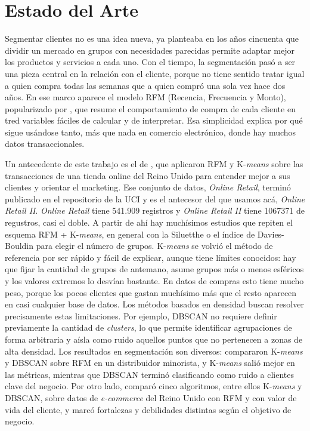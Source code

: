 \documentclass[a4paper,10pts,openany]{book}
\begin{document}
	\section{Estado del Arte}
	Segmentar clientes no es una idea nueva, \citet{smith1956} ya planteaba en los años cincuenta que dividir un mercado en grupos con necesidades parecidas permite adaptar mejor los productos y servicios a cada uno. Con el tiempo, la segmentación pasó a ser una pieza central en la relación con el cliente, porque no tiene sentido tratar igual a quien compra todas las semanas que a quien compró una sola vez hace dos años. En ese marco aparece el modelo RFM (Recencia, Frecuencia y Monto), popularizado por \citet{hughes1994}, que resume el comportamiento de compra de cada cliente en tred variables fáciles de calcular y de interpretar. Esa simplicidad explica por qué sigue usándose tanto, más que nada en comercio electrónico, donde hay muchos datos transaccionales.
	
	Un antecedente de este trabajo es el de \citet{chen2012}, que aplicaron RFM y K-\emph{means} sobre las transacciones de una tienda online del Reino Unido para entender mejor a sus clientes y orientar el marketing. Ese conjunto de datos, \emph{Online Retail}, terminó publicado en el repositorio de la UCI y es el antecesor del que usamos acá, \emph{Online Retail II}. \emph{Online Retail} tiene 541.909 registros y \emph{Online Retail II} tiene 1067371 de regustros, casi el doble. A partir de ahí hay muchísimos estudios que repiten el esquema RFM + K-\emph{means}, en general con la Siluetthe o el índice de Davies-Bouldin para elegir el número de grupos. K-\emph{means} \citep{macqueen1967} se volvió el método de referencia por ser rápido y fácil de explicar, aunque tiene límites conocidos: hay que fijar la cantidad de grupos de antemano, asume grupos más o menos esféricos y los valores extremos lo desvían bastante. En datos de compras esto tiene mucho peso, porque los pocos clientes que gastan muchísimo más que el resto aparecen en casi cualquier base de datos. Los métodos basados en densidad buscan resolver precisamente estas limitaciones. Por ejemplo, DBSCAN \citep{ester1996} no requiere definir previamente la cantidad de \emph{clusters}, lo que permite identificar agrupaciones de forma arbitraria y aísla como ruido aquellos puntos que no pertenecen a zonas de alta densidad. Los resultados en segmentación son diversos: \citet{lau2026} compararon K-\emph{means} y DBSCAN sobre RFM en un distribuidor minorista, y K-\emph{means} salió mejor en las métricas, mientras que DBSCAN terminó clasificando como ruido a clientes clave del negocio. Por otro lado, \citet{aimar2025} comparó cinco algoritmos, entre ellos K-\emph{means} y DBSCAN, sobre datos de \emph{e-commerce} del Reino Unido con RFM y con valor de vida del cliente, y marcó fortalezas y debilidades distintas según el objetivo de negocio.
	
\end{document}
